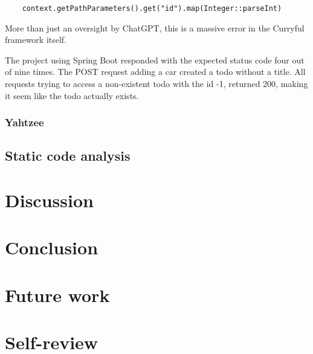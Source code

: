 \documentclass[a4paper]{article}
\begin{document}
\begin{verbatim}
	context.getPathParameters().get("id").map(Integer::parseInt)
\end{verbatim}

\noindent More than just an oversight by ChatGPT, this is a massive error in the
Curryful framework itself.
\newline

\noindent The project using Spring Boot responded with the expected status code
four out of nine times. The POST request adding a car created a todo without a
title. All requests trying to access a non-existent todo with the id -1,
returned 200, making it seem like the todo actually exists.

\subsubsection{Yahtzee}

\subsection{Static code analysis}

\section{Discussion}

\section{Conclusion}

\section{Future work}

\section{Self-review}

\newpage
\listoffigures

\newpage
\lstlistoflistings

\newpage
\listoftables

\newpage

\end{document}

